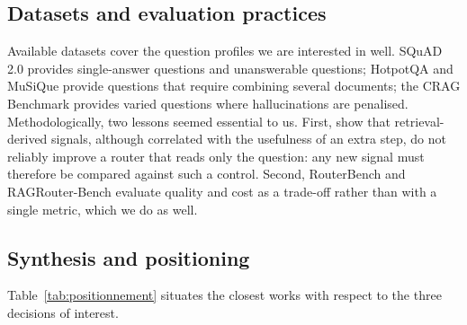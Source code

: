 \documentclass[11pt,a4paper]{article}
\begin{document}
\subsection{Datasets and evaluation practices}

Available datasets cover the question profiles we are interested in well. SQuAD 2.0
\citep{rajpurkar2018squad2} provides single-answer questions and unanswerable questions; HotpotQA
\citep{yang2018hotpotqa} and MuSiQue \citep{trivedi2022musique} provide questions that require combining
several documents; the CRAG Benchmark \citep{yang2024cragbench} provides varied questions where
hallucinations are penalised. Methodologically, two lessons seemed essential to us. First,
\citet{li2026beyond} show that retrieval-derived signals, although correlated with the usefulness of an
extra step, do not reliably improve a router that reads only the question: any new signal must therefore
be compared against such a control. Second, RouterBench and RAGRouter-Bench evaluate quality and cost as
a trade-off rather than with a single metric, which we do as well.

\subsection{Synthesis and positioning}

Table~\ref{tab:positionnement} situates the closest works with respect to the three decisions of
interest.
\end{document}

